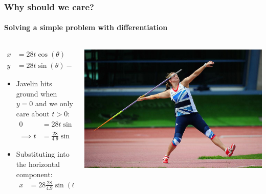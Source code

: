 \documentclass[\beamerclass]{beamer}
\begin{document}
\begin{frame}
\frametitle{Why should we care?}
\framesubtitle{Solving a simple problem with differentiation}

\begin{columns}
\begin{column}{0.65\textwidth}
	\vspace{-1ex}
	\begin{align*}
		x &= 28 t \cos(\theta)\\
		y &= 28 t \sin(\theta) - 4.9 t^2
	\end{align*}\vspace{-3ex}
	\begin{itemize}
		\item Javelin hits ground when $y = 0$ and we only care about $t>0$:
		\begin{align*}
		0 &= 28 t \sin(\theta) - 4.9 t^2 \\
		\implies t &= \frac{28}{4.9} \sin(\theta)
		\end{align*}
		\item Substituting into the horizontal component: \begin{align*}
		x &= 28 \frac{28}{4.9} \sin(\theta) \cos(\theta) = 80 \sin(2\theta)
		\end{align*}
	\end{itemize}
\end{column}
\begin{column}{0.35\textwidth}
	\includegraphics[width=\columnwidth]{javelin}
\end{column}
\end{columns}
\end{frame}
\end{document}
